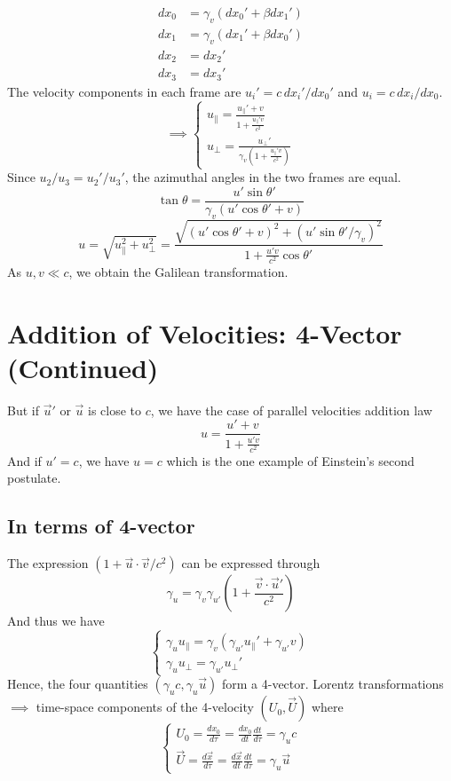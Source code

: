 \documentclass{article}
\begin{document}
	\begin{align*}
		dx_0 &= \gamma_v (dx_0' + \beta dx_1') \\
		dx_1 &= \gamma_v (dx_1' + \beta dx_0') \\
		dx_2 &= dx_2' \\
		dx_3 &= dx_3'
	\end{align*}
	The velocity components in each frame are $u_i' = c \, dx_i' / dx_0'$ and $u_i = c \, dx_i / dx_0$.
	\[
	\implies
	\begin{cases}
		u_{\parallel} = \frac{u_{\parallel}' + v}{1 + \frac{u_{\parallel}' v}{c^2}} \\
		u_{\perp} = \frac{u_{\perp}'}{\gamma_v(1 + \frac{u_{\parallel}' v}{c^2})}
	\end{cases}
	\]
	Since $u_2/u_3 = u_2'/u_3'$, the azimuthal angles in the two frames are equal.
	\[ \tan\theta = \frac{u' \sin\theta'}{\gamma_v(u' \cos\theta' + v)} \]
	\[ u = \sqrt{u_{\parallel}^2 + u_{\perp}^2} = \frac{\sqrt{(u' \cos\theta' + v)^2 + (u' \sin\theta' / \gamma_v)^2}}{1 + \frac{u'v}{c^2}\cos\theta'} \]
	As $u, v \ll c$, we obtain the Galilean transformation.
	\section*{Addition of Velocities: 4-Vector (Continued)}
	
	But if $\vec{u}'$ or $\vec{u}$ is close to $c$, we have the case of parallel velocities addition law
	\[ u = \frac{u' + v}{1 + \frac{u'v}{c^2}} \]
	And if $u' = c$, we have $u=c$ which is the one example of Einstein's second postulate.
	
	\subsection*{In terms of 4-vector}
	The expression $(1 + \vec{u} \cdot \vec{v} / c^2)$ can be expressed through
	\[ \gamma_u = \gamma_v \gamma_{u'} (1 + \frac{\vec{v} \cdot \vec{u}'}{c^2}) \]
	And thus we have
	\[
	\begin{cases}
		\gamma_u u_{\parallel} = \gamma_v (\gamma_{u'} u_{\parallel}' + \gamma_{u'} v) \\
		\gamma_u u_{\perp} = \gamma_{u'} u_{\perp}'
	\end{cases}
	\]
	Hence, the four quantities $(\gamma_u c, \gamma_u \vec{u})$ form a 4-vector.
	Lorentz transformations $\implies$ time-space components of the 4-velocity $(U_0, \vec{U})$
	where
	\[
	\begin{cases}
		U_0 = \frac{dx_0}{d\tau} = \frac{dx_0}{dt}\frac{dt}{d\tau} = \gamma_u c \\
		\vec{U} = \frac{d\vec{x}}{d\tau} = \frac{d\vec{x}}{dt}\frac{dt}{d\tau} = \gamma_u \vec{u}
	\end{cases}
	\]
	
\end{document}
